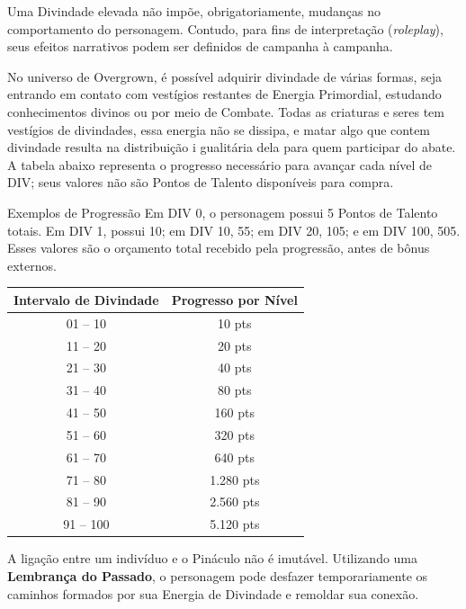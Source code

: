 Uma Divindade elevada não impõe, obrigatoriamente, mudanças no comportamento do personagem. 
Contudo, para fins de interpretação (\textit{roleplay}), seus efeitos narrativos podem ser definidos 
de campanha à campanha.

No universo de Overgrown, é possível adquirir divindade de várias formas, 
seja entrando em contato com vestígios restantes de Energia Primordial, estudando conhecimentos divinos ou 
por meio de Combate. Todas as criaturas e seres tem vestígios de divindades, 
essa energia não se dissipa, e matar algo que contem divindade resulta na distribuição i
gualitária dela para quem participar do abate. A tabela abaixo representa o progresso necessário para avançar cada nível de DIV; seus valores não são Pontos de Talento disponíveis para compra.

\begin{rpgboxtips}{Exemplos de Progressão}
Em DIV 0, o personagem possui 5 Pontos de Talento totais. Em DIV 1, possui 10; em DIV 10, 55; em DIV 20, 105; e em DIV 100, 505. Esses valores são o orçamento total recebido pela progressão, antes de bônus externos.
\end{rpgboxtips}

\begin{center}
\renewcommand{\arraystretch}{1.3}
\begin{tabular}{@{} cc @{}}
\toprule
\rowcolor{gray!15} \textbf{Intervalo de Divindade} & \textbf{Progresso por Nível} \\ 
\midrule
01 -- 10 & 10 pts \\
11 -- 20 & 20 pts \\
21 -- 30 & 40 pts \\
31 -- 40 & 80 pts \\
41 -- 50 & 160 pts \\
\midrule
51 -- 60 & 320 pts \\
61 -- 70 & 640 pts \\
71 -- 80 & 1.280 pts \\
81 -- 90 & 2.560 pts \\
91 -- 100 & 5.120 pts \\
\bottomrule
\end{tabular}
\end{center}


A ligação entre um indivíduo e o Pináculo não é imutável. Utilizando uma \textbf{Lembrança do Passado}, o personagem pode desfazer temporariamente os caminhos formados por sua Energia de Divindade e remoldar sua conexão.

